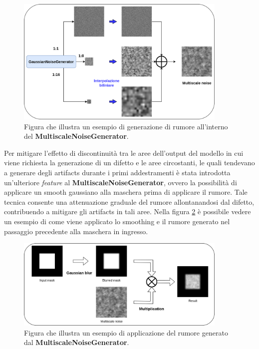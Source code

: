 \begin{figure}[H]
    \centering
    \includegraphics[width=0.9\textwidth]{imgs/Coigan/Multiscale_noise/Multiscale_noise_generation.png}
    \caption{Figura che illustra un esempio di generazione di rumore all'interno del \textbf{MultiscaleNoiseGenerator}.}
    \label{fig:multiscale_noise_generation}
\end{figure}

Per mitigare l'effetto di discontinuità tra le aree dell'output del modello in cui viene richiesta la generazione di un 
difetto e le aree circostanti, le quali tendevano a generare degli artifacts durante i primi addestramenti è stata introdotta un'ulteriore
\textit{feature} al \textbf{MultiscaleNoiseGenerator}, ovvero la possibilità di applicare un smooth gaussiano alla maschera prima di applicare il rumore.
Tale tecnica consente una attenuazione graduale del rumore allontanandosi dal difetto, contribuendo a mitigare gli artifacts in tali aree.
Nella figura \ref{fig:multiscale_noise_application} è possibile vedere un esempio di come viene applicato lo smoothing e il rumore generato nel passaggio precedente
alla maschera in ingresso.

\begin{figure}[H]
    \centering
    \includegraphics[width=0.9\textwidth]{imgs/Coigan/Multiscale_noise/Multiscale_noise_application.png}
    \caption{Figura che illustra un esempio di applicazione del rumore generato dal \textbf{MultiscaleNoiseGenerator}.}
    \label{fig:multiscale_noise_application}
\end{figure}

